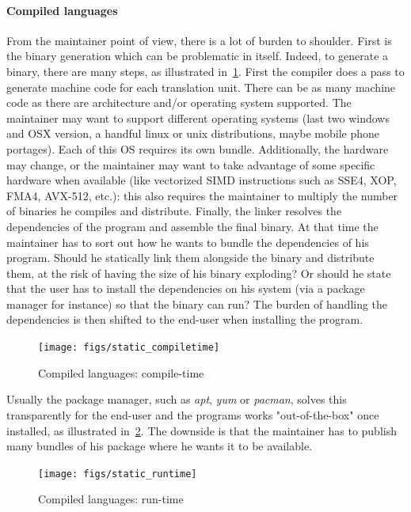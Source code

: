 \paragraph{Compiled languages} From the maintainer point of view, there is a lot of burden to shoulder. First is the
binary generation which can be problematic in itself. Indeed, to generate a binary, there are many steps, as illustrated
in~\cref{fig:static.dynamic.compiled.compiletime}. First the compiler does a pass to generate machine code for each
translation unit. There can be as many machine code as there are architecture and/or operating system supported. The
maintainer may want to support different operating systems (last two windows and OSX version, a handful linux or unix
distributions, maybe mobile phone portages). Each of this OS requires its own bundle. Additionally, the hardware may
change, or the maintainer may want to take advantage of some specific hardware when available (like vectorized SIMD
instructions such as SSE4, XOP, FMA4, AVX-512, etc.): this also requires the maintainer to multiply the number of
binaries he compiles and distribute. Finally, the linker resolves the dependencies of the program and assemble the final
binary. At that time the maintainer has to sort out how he wants to bundle the dependencies of his program. Should he
statically link them alongside the binary and distribute them, at the risk of having the size of his binary exploding?
Or should he state that the user has to install the dependencies on his system (via a package manager for instance) so
that the binary can run? The burden of handling the dependencies is then shifted to the end-user when installing the
program.

\begin{figure}[htbp]
  \centering
  \texttt{[image: figs/static\_compiletime]}
  \caption{Compiled languages: compile-time}
  \label{fig:static.dynamic.compiled.compiletime}
\end{figure}


Usually the package manager, such as \emph{apt}, \emph{yum} or \emph{pacman}, solves this transparently for the end-user
and the programs works "out-of-the-box" once installed, as illustrated in~\cref{fig:static.dynamic.compiled.runtime}.
The downside is that the maintainer has to publish many bundles of his package where he wants it to be available.

\begin{figure}[htbp]
  \centering
  \texttt{[image: figs/static\_runtime]}
  \caption{Compiled languages: run-time}
  \label{fig:static.dynamic.compiled.runtime}
\end{figure}

